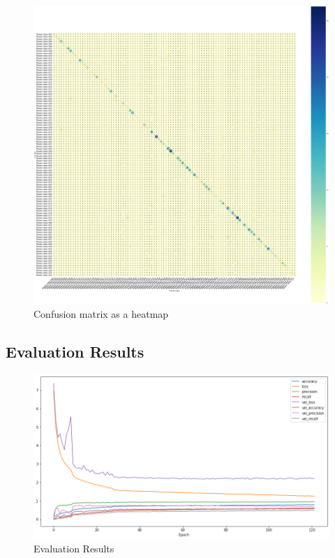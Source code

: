 \documentclass[a4paper,19pt]{article}
\begin{document}
\begin{figure}[h!]
\centering
\includegraphics[scale=0.225]{images/heatmaps.png}
\caption{Confusion matrix as a heatmap}
\label{fig:Results}
\end{figure}


\subsection{Evaluation Results} 

\begin{figure}[h!]
\centering
\includegraphics[scale=0.6]{images/overalleva.png}
\caption{Evaluation Results}
\label{fig:Results}
\end{figure}
\end{document}
